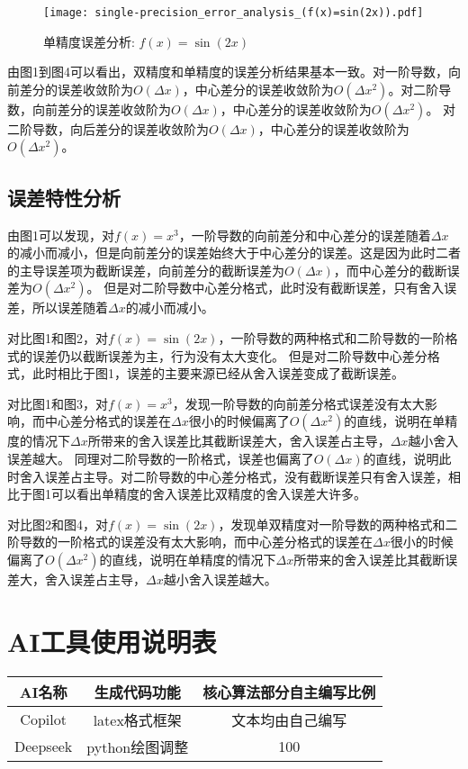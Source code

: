 \documentclass[12pt,a4paper]{article}
\begin{document}
\begin{figure}[!htbp]
    \centering
    \texttt{[image: single-precision\_error\_analysis\_(f(x)=sin(2x)).pdf]}
    \caption{单精度误差分析: $f(x) = \sin(2x)$}
\end{figure}
\newpage

由图1到图4可以看出，双精度和单精度的误差分析结果基本一致。对一阶导数，向前差分的误差收敛阶为$O(\Delta x)$，中心差分的误差收敛阶为$O(\Delta x^2)$。对二阶导数，向前差分的误差收敛阶为$O(\Delta x)$，中心差分的误差收敛阶为$O(\Delta x^2)$。
对二阶导数，向后差分的误差收敛阶为$O(\Delta x)$，中心差分的误差收敛阶为$O(\Delta x^2)$。

\subsection{误差特性分析}


由图1可以发现，对$f(x) = x^3$，一阶导数的向前差分和中心差分的误差随着$\Delta x$的减小而减小，但是向前差分的误差始终大于中心差分的误差。这是因为此时二者的主导误差项为截断误差，向前差分的截断误差为$O(\Delta x)$，而中心差分的截断误差为$O(\Delta x^2)$。
但是对二阶导数中心差分格式，此时没有截断误差，只有舍入误差，所以误差随着$\Delta x$的减小而减小。

对比图1和图2，对$f(x) = \sin(2x)$，一阶导数的两种格式和二阶导数的一阶格式的误差仍以截断误差为主，行为没有太大变化。
但是对二阶导数中心差分格式，此时相比于图1，误差的主要来源已经从舍入误差变成了截断误差。

对比图1和图3，对$f(x) = x^3$，发现一阶导数的向前差分格式误差没有太大影响，而中心差分格式的误差在$\Delta x$很小的时候偏离了$O(\Delta x^2)$的直线，说明在单精度的情况下$\Delta x$所带来的舍入误差比其截断误差大，舍入误差占主导，$\Delta x$越小舍入误差越大。
同理对二阶导数的一阶格式，误差也偏离了$O(\Delta x)$的直线，说明此时舍入误差占主导。对二阶导数的中心差分格式，没有截断误差只有舍入误差，相比于图1可以看出单精度的舍入误差比双精度的舍入误差大许多。

对比图2和图4，对$f(x) = \sin(2x)$，发现单双精度对一阶导数的两种格式和二阶导数的一阶格式的误差没有太大影响，而中心差分格式的误差在$\Delta x$很小的时候偏离了$O(\Delta x^2)$的直线，说明在单精度的情况下$\Delta x$所带来的舍入误差比其截断误差大，舍入误差占主导，$\Delta x$越小舍入误差越大。

\section{AI工具使用说明表}
\begin{table}[!htbp]
    \centering
    \begin{tabular}{|c|c|c|}
        \hline
        \textbf{AI名称} & \textbf{生成代码功能} & \textbf{核心算法部分自主编写比例} \\
        \hline
        Copilot & latex格式框架 & 文本均由自己编写 \\
        \hline
        Deepseek & python绘图调整 & 100\\
        \hline
\end{tabular}
\end{table}
\end{document}
